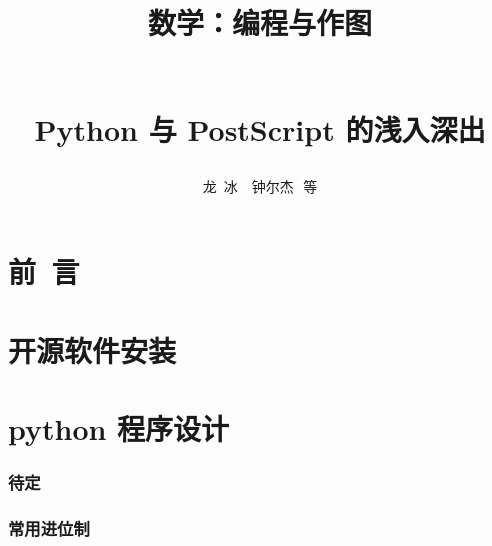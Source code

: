 \documentclass[zihao=-4,linespread=1.5,heading=true,a4paper,twoside]{ctexart}
\title{\begin{kaishu}数学：编程与作图\end{kaishu}\\
	Python 与 PostScript 的浅入深出}
\author{\kaishu 龙\,  冰\, \, 钟尔杰\,\,  等}
\begin{document}
\begin{titlepage}
	\maketitle
\end{titlepage}

\part*{\kaishu 前\, 言}\label{sec:preface}


\newpage\tableofcontents

\newpage\part{开源软件安装}


\newpage\part{python 程序设计}
\section{待定}\label{sec:II.1}


\section{常用进位制}\label{sec:II.2}


%

%

%
\end{document}
